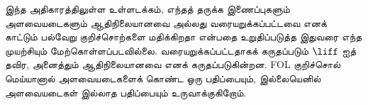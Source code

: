 \documentclass[../../../include/open-logic-chapter]{subfiles}
\begin{document}
      {}
      {}

\begin{editorial}
இந்த அதிகாரத்திலுள்ள உள்ளடக்கம், எந்தத் தருக்க இணைப்புகளும்
அளவையடைகளும் ஆதிநிலையானவை அல்லது வரையறுக்கப்பட்டவை எனக் காட்டும்
பல்வேறு குறிச்சொற்களை மதிக்கிறதா என்பதை உறுதிப்படுத்த இதுவரை எந்த
முயற்சியும் மேற்கொள்ளப்படவில்லை. வரையறுக்கப்பட்டதாகக் கருதப்படும்
$\liff$ ஐத் தவிர, அனைத்தும் ஆதிநிலையானவை எனக் கருதப்படுகின்றன. FOL
குறிச்சொல் மெய்யானால் அளவையடைகளைக் கொண்ட ஒரு பதிப்பையும், இல்லையெனில்
அளவையடைகள் இல்லாத பதிப்பையும் உருவாக்குகிறோம்.
\end{editorial}














\OLEndChapterHook
\end{document}
